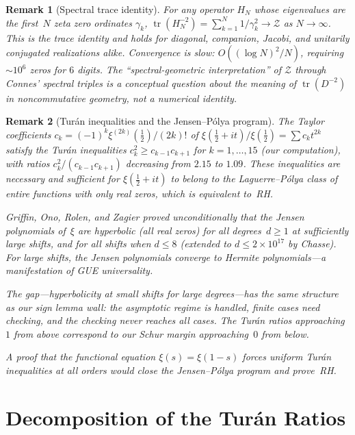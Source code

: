 \documentclass[11pt,a4paper]{article}
\newtheorem{remark}{Remark}[section]
\DeclareMathOperator{\tr}{tr}
\begin{document}
\begin{remark}[Spectral trace identity]
For any operator $H_N$ whose eigenvalues are the first~$N$ zeta zero ordinates $\gamma_k$, $\tr(H_N^{-2}) = \sum_{k=1}^N 1/\gamma_k^2 \to \mathcal{Z}$ as $N \to \infty$. This is the trace identity and holds for diagonal, companion, Jacobi, and unitarily conjugated realizations alike. Convergence is slow: $O((\log N)^2/N)$, requiring $\sim 10^6$ zeros for $6$ digits. The ``spectral-geometric interpretation'' of $\mathcal{Z}$ through Connes' spectral triples \cite{CC2025} is a conceptual question about the meaning of $\tr(D^{-2})$ in noncommutative geometry, not a numerical identity.
\end{remark}

\begin{remark}[Tur\'an inequalities and the Jensen--P\'olya program]\label{rem:turan}
The Taylor coefficients $c_k = (-1)^k \xi^{(2k)}(\tfrac{1}{2})/(2k)!$ of $\xi(\tfrac{1}{2} + it)/\xi(\tfrac{1}{2}) = \sum c_k t^{2k}$ satisfy the Tur\'an inequalities $c_k^2 \geq c_{k-1} c_{k+1}$ for $k = 1, \ldots, 15$ (our computation), with ratios $c_k^2/(c_{k-1}c_{k+1})$ decreasing from $2.15$ to $1.09$. These inequalities are necessary and sufficient for $\xi(\tfrac{1}{2} + it)$ to belong to the Laguerre--P\'olya class of entire functions with only real zeros, which is equivalent to~RH.

Griffin, Ono, Rolen, and Zagier \cite{GORZ2019} proved unconditionally that the Jensen polynomials of~$\xi$ are hyperbolic (all real zeros) for all degrees~$d \geq 1$ at sufficiently large shifts, and for all shifts when $d \leq 8$ (extended to $d \leq 2 \times 10^{17}$ by Chasse). For large shifts, the Jensen polynomials converge to Hermite polynomials---a manifestation of GUE universality.

The gap---hyperbolicity at small shifts for large degrees---has the same structure as our sign lemma wall: the asymptotic regime is handled, finite cases need checking, and the checking never reaches all cases. The Tur\'an ratios approaching~$1$ from above correspond to our Schur margin approaching~$0$ from below.

A proof that the functional equation $\xi(s) = \xi(1-s)$ forces uniform Tur\'an inequalities at all orders would close the Jensen--P\'olya program and prove~RH.
\end{remark}

\section{Decomposition of the Tur\'an Ratios}\label{sec:decomp_turan}
\end{document}
